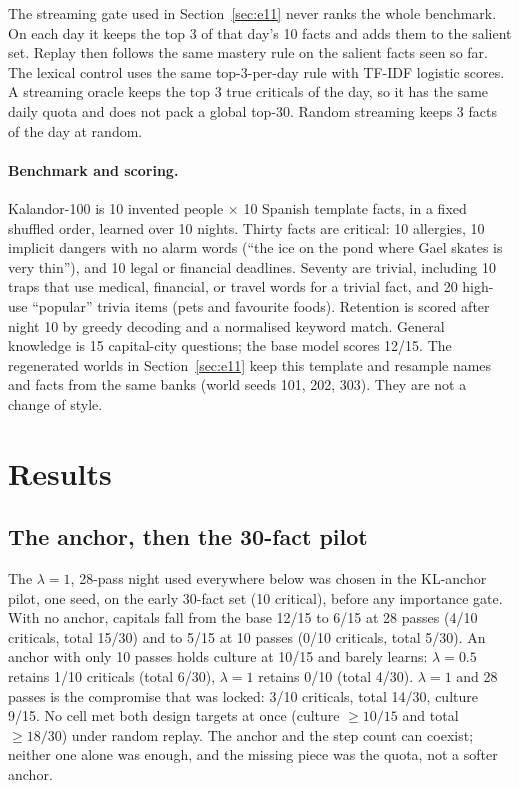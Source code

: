 \documentclass[11pt,a4paper]{article}
\begin{document}
The streaming gate used in Section~\ref{sec:e11} never ranks the whole benchmark.
On each day it keeps the top 3 of that day's 10 facts and adds them to the salient set.
Replay then follows the same mastery rule on the salient facts seen so far.
The lexical control uses the same top-3-per-day rule with TF-IDF logistic scores.
A streaming oracle keeps the top 3 true criticals of the day, so it has the same daily quota and does not pack a global top-30.
Random streaming keeps 3 facts of the day at random.

\paragraph{Benchmark and scoring.}
Kalandor-100 is 10 invented people $\times$ 10 Spanish template facts, in a fixed shuffled order, learned over 10 nights.
Thirty facts are critical: 10 allergies, 10 implicit dangers with no alarm words (``the ice on the pond where Gael skates is very thin''), and 10 legal or financial deadlines.
Seventy are trivial, including 10 traps that use medical, financial, or travel words for a trivial fact, and 20 high-use ``popular'' trivia items (pets and favourite foods).
Retention is scored after night 10 by greedy decoding and a normalised keyword match.
General knowledge is 15 capital-city questions; the base model scores 12/15.
The regenerated worlds in Section~\ref{sec:e11} keep this template and resample names and facts from the same banks (world seeds 101, 202, 303).
They are not a change of style.

\section{Results}

\subsection{The anchor, then the 30-fact pilot}
\label{sec:pilots}

The $\lambda{=}1$, 28-pass night used everywhere below was chosen in the KL-anchor pilot, one seed, on the early 30-fact set (10 critical), before any importance gate.
With no anchor, capitals fall from the base 12/15 to 6/15 at 28 passes (4/10 criticals, total 15/30) and to 5/15 at 10 passes (0/10 criticals, total 5/30).
An anchor with only 10 passes holds culture at 10/15 and barely learns: $\lambda{=}0.5$ retains 1/10 criticals (total 6/30), $\lambda{=}1$ retains 0/10 (total 4/30).
$\lambda{=}1$ and 28 passes is the compromise that was locked: 3/10 criticals, total 14/30, culture 9/15.
No cell met both design targets at once (culture $\geq 10/15$ and total $\geq 18/30$) under random replay.
The anchor and the step count can coexist; neither one alone was enough, and the missing piece was the quota, not a softer anchor.
\end{document}
